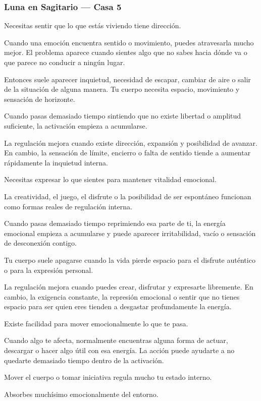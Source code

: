 \documentclass[11pt,a4paper]{article}
\begin{document}
\subsubsection*{Luna en Sagitario — Casa 5}

Necesitas sentir que lo que estás viviendo tiene dirección.

Cuando una emoción encuentra sentido o movimiento, puedes atravesarla mucho mejor. El problema aparece cuando sientes algo que no sabes hacia dónde va o que parece no conducir a ningún lugar.

Entonces suele aparecer inquietud, necesidad de escapar, cambiar de aire o salir de la situación de alguna manera. Tu cuerpo necesita espacio, movimiento y sensación de horizonte.

Cuando pasas demasiado tiempo sintiendo que no existe libertad o amplitud suficiente, la activación empieza a acumularse.

La regulación mejora cuando existe dirección, expansión y posibilidad de avanzar. En cambio, la sensación de límite, encierro o falta de sentido tiende a aumentar rápidamente la inquietud interna.

Necesitas expresar lo que sientes para mantener vitalidad emocional.

La creatividad, el juego, el disfrute o la posibilidad de ser espontáneo funcionan como formas reales de regulación interna.

Cuando pasas demasiado tiempo reprimiendo esa parte de ti, la energía emocional empieza a acumularse y puede aparecer irritabilidad, vacío o sensación de desconexión contigo.

Tu cuerpo suele apagarse cuando la vida pierde espacio para el disfrute auténtico o para la expresión personal.

La regulación mejora cuando puedes crear, disfrutar y expresarte libremente. En cambio, la exigencia constante, la represión emocional o sentir que no tienes espacio para ser quien eres tienden a desgastar profundamente la energía.

Existe facilidad para mover emocionalmente lo que te pasa.

Cuando algo te afecta, normalmente encuentras alguna forma de actuar, descargar o hacer algo útil con esa energía. La acción puede ayudarte a no quedarte demasiado tiempo dentro de la activación.

Mover el cuerpo o tomar iniciativa regula mucho tu estado interno.

Absorbes muchísimo emocionalmente del entorno.
\end{document}
